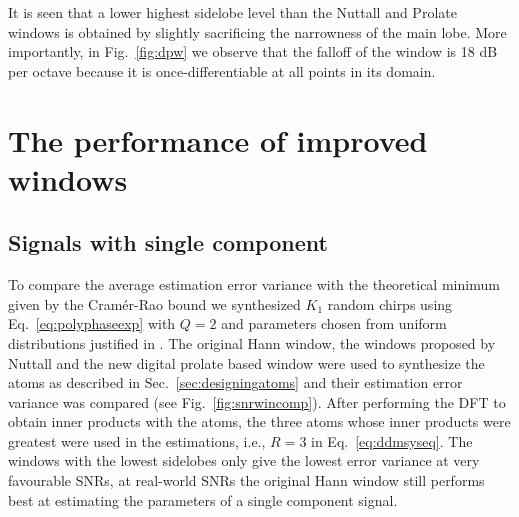 \documentclass[twoside,a4paper]{article}
\begin{document}
It is seen that a lower highest sidelobe level than the Nuttall and Prolate
windows is obtained by slightly sacrificing the narrowness of the main lobe.
More importantly, in Fig.~\ref{fig:dpw} we observe that the falloff of the
window is 18 dB per octave because it is once-differentiable at all points in
its domain.

\section{The performance of improved windows}

\subsection{Signals with single component}

To compare the average estimation error variance with the
theoretical minimum given by the Cram\'{e}r-Rao bound we synthesized $K_{1}$ random
chirps using Eq.~\ref{eq:polyphaseexp}
with $Q=2$ and parameters chosen from uniform distributions justified in
\cite{betser2009sinusoidal}. The original Hann window,
the windows proposed by Nuttall and the new digital prolate based window were
used to synthesize the atoms as described in Sec.~\ref{sec:designingatoms} and
their estimation error variance was compared (see
Fig.~\ref{fig:snrwincomp}). After performing the DFT to obtain inner products
with the atoms, the three atoms whose inner products were greatest were used in
the estimations, i.e., $R=3$ in Eq.~\ref{eq:ddmsyseq}. The windows with the
lowest sidelobes only give the lowest error variance at very favourable SNRs, at
real-world SNRs the original Hann window still performs best at estimating the
parameters of a single component signal.
\end{document}
